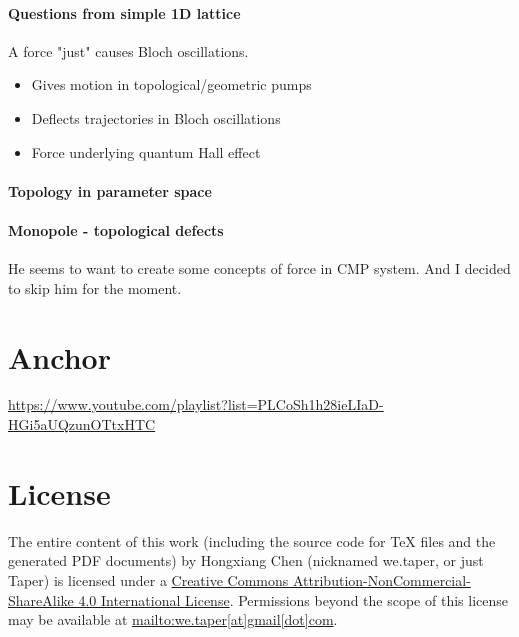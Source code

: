 \documentclass{article}
\numberwithin{equation}{subsection} %
\theoremstyle{definition}
\begin{document}
\paragraph{Questions from simple 1D lattice}
A force "just" causes Bloch oscillations.
\begin{itemize}
    \item Gives motion in topological/geometric pumps 
    \item Deflects trajectories in Bloch oscillations
    \item Force underlying quantum Hall effect
\end{itemize}

\paragraph{Topology in parameter space}
\paragraph{Monopole - topological defects}

He seems to want to create some concepts of force in CMP system. And I
decided to skip him for the moment.
\section{Anchor}
\label{sec:Anchor}

\begin{thebibliography}{1}
    \url{https://www.youtube.com/playlist?list=PLCoSh1h28ieLIaD-HGi5aUQzunOTtxHTC}
\end{thebibliography}
\printnomenclature
\section{License}
The entire content of this work (including the source code
for TeX files and the generated PDF documents) by 
Hongxiang Chen (nicknamed we.taper, or just Taper) is
licensed under a 
\href{http://creativecommons.org/licenses/by-nc-sa/4.0/}{Creative 
Commons Attribution-NonCommercial-ShareAlike 4.0 International 
License}. Permissions beyond the scope of this 
license may be available at \url{mailto:we.taper[at]gmail[dot]com}.
\end{document}
